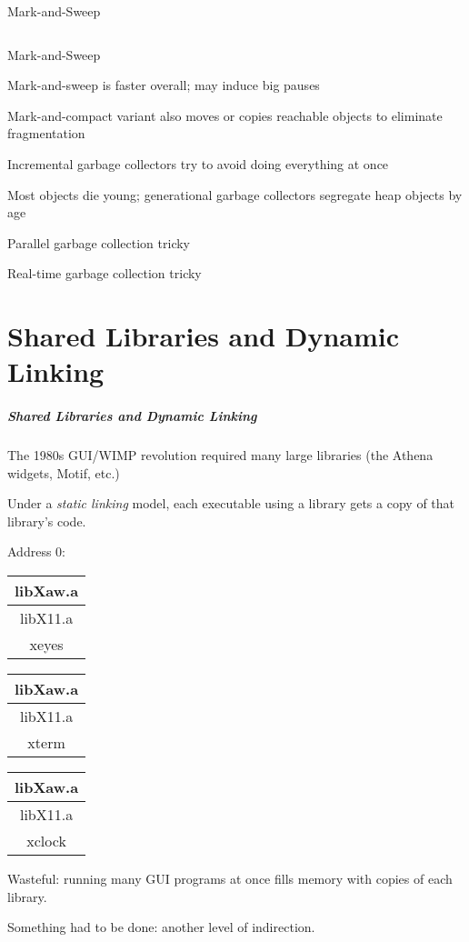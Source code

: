 \documentclass{plt}
\begin{document}
\begin{frame}[fragile,t]{Mark-and-Sweep}
\begin{columns}[t]
\begin{column}{0.6\textwidth}
\end{column}
\end{columns}

\end{frame}

\begin{frame}{Mark-and-Sweep}
\baselineskip

Mark-and-sweep is faster overall; may induce big pauses

Mark-and-compact variant also moves or copies reachable objects to
eliminate fragmentation

Incremental garbage collectors try to avoid doing everything at once

Most objects die young; generational garbage collectors segregate heap
objects by age

Parallel garbage collection tricky

Real-time garbage collection tricky

\end{frame}

\part{Shared Libraries and Dynamic Linking}

\begin{frame}
  \frametitle{Shared Libraries and Dynamic Linking}

The 1980s GUI/WIMP revolution required many large libraries
(the Athena widgets, Motif, etc.)

Under a \emph{static linking} model, each executable using a library
gets a copy of that library's code.

Address 0:
\begin{tabular}[b]{|c|}
\hline
libXaw.a \\
\hline
libX11.a \\
\hline
xeyes \\
\hline
\end{tabular}
\begin{tabular}[b]{|c|}
\hline
libXaw.a \\
\hline
libX11.a \\
\hline
xterm \\[3pc]
\hline
\end{tabular}
\begin{tabular}[b]{|c|}
\hline
libXaw.a \\
\hline
libX11.a \\
\hline
xclock \\[5pt]
\hline
\end{tabular}

\pause

Wasteful: running many GUI programs at once fills memory with
 copies of each library.

Something had to be done: another level of indirection.

\end{frame}
\end{document}
